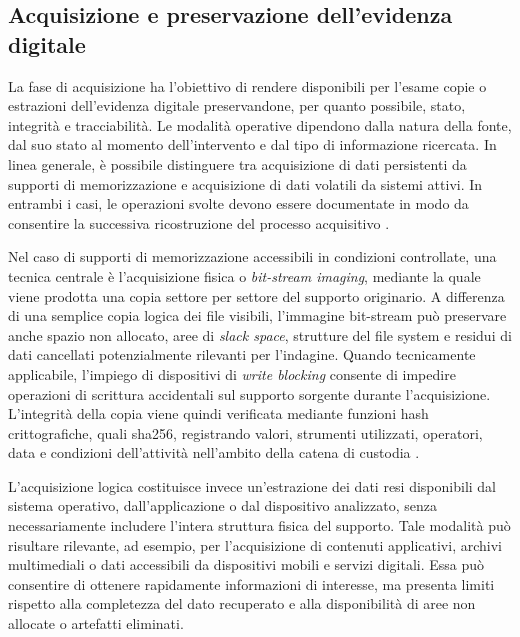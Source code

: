 \subsection{Acquisizione e preservazione dell'evidenza digitale}
\label{subsec:background_acquisition_preservation}

La fase di acquisizione ha l'obiettivo di rendere disponibili per l'esame copie o estrazioni dell'evidenza digitale preservandone, per quanto possibile, stato, integrità e tracciabilità. Le modalità operative dipendono dalla natura della fonte, dal suo stato al momento dell'intervento e dal tipo di informazione ricercata. In linea generale, è possibile distinguere tra acquisizione di dati persistenti da supporti di memorizzazione e acquisizione di dati volatili da sistemi attivi. In entrambi i casi, le operazioni svolte devono essere documentate in modo da consentire la successiva ricostruzione del processo acquisitivo \cite{nist2006guide,iso27037,casey2011digital}.

Nel caso di supporti di memorizzazione accessibili in condizioni controllate, una tecnica centrale è l'acquisizione fisica o \textit{bit-stream imaging}, mediante la quale viene prodotta una copia settore per settore del supporto originario. A differenza di una semplice copia logica dei file visibili, l'immagine bit-stream può preservare anche spazio non allocato, aree di \textit{slack space}, strutture del file system e residui di dati cancellati potenzialmente rilevanti per l'indagine. Quando tecnicamente applicabile, l'impiego di dispositivi di \textit{write blocking} consente di impedire operazioni di scrittura accidentali sul supporto sorgente durante l'acquisizione. L'integrità della copia viene quindi verificata mediante funzioni hash crittografiche, quali \gls{sha256}, registrando valori, strumenti utilizzati, operatori, data e condizioni dell'attività nell'ambito della catena di custodia \cite{carrier2005filesystem,iso27037,swgde_guidelines}.

L'acquisizione logica costituisce invece un'estrazione dei dati resi disponibili dal sistema operativo, dall'applicazione o dal dispositivo analizzato, senza necessariamente includere l'intera struttura fisica del supporto. Tale modalità può risultare rilevante, ad esempio, per l'acquisizione di contenuti applicativi, archivi multimediali o dati accessibili da dispositivi mobili e servizi digitali. Essa può consentire di ottenere rapidamente informazioni di interesse, ma presenta limiti rispetto alla completezza del dato recuperato e alla disponibilità di aree non allocate o artefatti eliminati.

